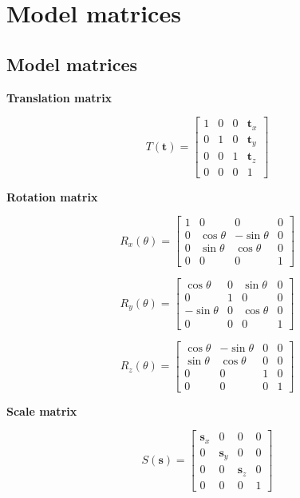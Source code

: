 \chapter{Model matrices}
\renewcommand{\arraystretch}{1}
\label{sec:matrices}
\section{Model matrices}

\textbf{Translation matrix}

$$T(\mathbf{t}) = \left[\begin{array}{cccc}
1 & 0 & 0 & \mathbf{t}_x       \\
0 & 1 & 0 & \mathbf{t}_y       \\
0 & 0 & 1 & \mathbf{t}_z       \\
0 & 0 & 0 & 1
\end{array}\right]$$


\textbf{Rotation matrix}

$$R_x(\theta) = \left[\begin{array}{cccc}
1 & 0 & 0 & 0       \\
0 & \cos\theta & -\sin\theta & 0       \\
0 & \sin\theta & \cos\theta & 0      \\
0 & 0 & 0 & 1
\end{array}\right]$$

$$R_y(\theta) = \left[\begin{array}{cccc}
\cos\theta & 0 & \sin\theta & 0       \\
0 & 1 & 0 & 0       \\
-\sin\theta & 0 & \cos\theta & 0      \\
0 & 0 & 0 & 1
\end{array}\right]$$

$$R_z(\theta) = \left[\begin{array}{cccc}
\cos\theta & -\sin\theta & 0 & 0       \\
\sin\theta & \cos\theta & 0 & 0       \\
0 & 0 & 1 & 0      \\
0 & 0 & 0 & 1
\end{array}\right]$$

\textbf{Scale matrix}

$$S(\mathbf{s}) = \left[\begin{array}{cccc}
\mathbf{s}_x & 0 & 0 & 0       \\
0 & \mathbf{s}_y & 0 & 0       \\
0 & 0 & \mathbf{s}_z & 0      \\
0 & 0 & 0 & 1
\end{array}\right]$$


